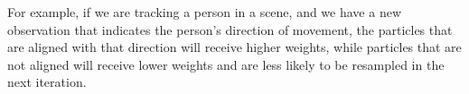 For example, if we are tracking a person in a scene, and we have a new observation that indicates the person's direction of movement, the particles
that are aligned with that direction will receive higher weights, while particles that are not aligned will receive lower weights and are less likely to be resampled in the next iteration.